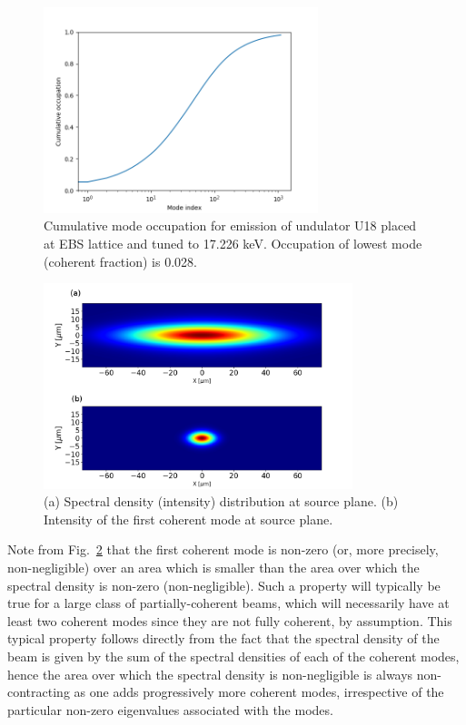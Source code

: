 \documentclass[%
 reprint,
 amsmath,amssymb,
 aps,
]{revtex4-1}
\begin{document}
\begin{figure}
\includegraphics[width=8cm]{Figures/vx_cumulated.png}
\caption{Cumulative mode occupation for  emission of undulator U18 placed at EBS lattice and tuned to 17.226 keV. Occupation of lowest mode (coherent fraction) is 0.028.}
\label{cumulative_mode_occupation}
\end{figure}

\begin{figure}%
\includegraphics[width=9.0cm]{Figures/spectral_density.png}
\caption{(a) Spectral density (intensity) distribution at source plane. (b) Intensity of the first coherent mode at source plane.}
\label{spectral_density}
\end{figure}

Note from Fig.~\ref{spectral_density} that the first coherent mode is non-zero (or, more precisely, non-negligible) over an area which is smaller than the area over which the spectral density is non-zero (non-negligible). Such a property will typically be true for a large class of partially-coherent beams, which will necessarily have at least two coherent modes since they are not fully coherent, by assumption.  This typical property follows directly from the fact that the spectral density of the beam is given by the sum of the spectral densities of each of the coherent modes, hence the area over which the spectral density is non-negligible is always non-contracting as one adds progressively more coherent modes, irrespective of the particular non-zero eigenvalues associated with the modes.  
\end{document}
